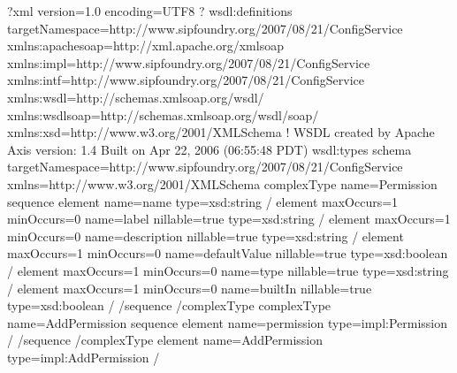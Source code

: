 \documentclass[letterpaper,10pt,english]{sphinxmanual}
\begin{document}
\begin{sphinxVerbatim}[commandchars=\\\{\}]
\PYGZlt{}?xml version=\PYGZdq{}1.0\PYGZdq{} encoding=\PYGZdq{}UTF\PYGZhy{}8\PYGZdq{} ?\PYGZgt{}
\PYGZlt{}wsdl:definitions targetNamespace=\PYGZdq{}http://www.sipfoundry.org/2007/08/21/ConfigService\PYGZdq{} xmlns:apachesoap=\PYGZdq{}http://xml.apache.org/xml\PYGZhy{}soap\PYGZdq{} xmlns:impl=\PYGZdq{}http://www.sipfoundry.org/2007/08/21/ConfigService\PYGZdq{} xmlns:intf=\PYGZdq{}http://www.sipfoundry.org/2007/08/21/ConfigService\PYGZdq{} xmlns:wsdl=\PYGZdq{}http://schemas.xmlsoap.org/wsdl/\PYGZdq{} xmlns:wsdlsoap=\PYGZdq{}http://schemas.xmlsoap.org/wsdl/soap/\PYGZdq{} xmlns:xsd=\PYGZdq{}http://www.w3.org/2001/XMLSchema\PYGZdq{}\PYGZgt{}
\PYGZhy{} \PYGZlt{}!\PYGZhy{}\PYGZhy{}
WSDL created by Apache Axis version: 1.4
Built on Apr 22, 2006 (06:55:48 PDT)
\PYGZhy{}\PYGZhy{}\PYGZgt{}
\PYGZlt{}wsdl:types\PYGZgt{}
\PYGZlt{}schema targetNamespace=\PYGZdq{}http://www.sipfoundry.org/2007/08/21/ConfigService\PYGZdq{} xmlns=\PYGZdq{}http://www.w3.org/2001/XMLSchema\PYGZdq{}\PYGZgt{}
\PYGZlt{}complexType name=\PYGZdq{}Permission\PYGZdq{}\PYGZgt{}
\PYGZlt{}sequence\PYGZgt{}
\PYGZlt{}element name=\PYGZdq{}name\PYGZdq{} type=\PYGZdq{}xsd:string\PYGZdq{} /\PYGZgt{}
\PYGZlt{}element maxOccurs=\PYGZdq{}1\PYGZdq{} minOccurs=\PYGZdq{}0\PYGZdq{} name=\PYGZdq{}label\PYGZdq{} nillable=\PYGZdq{}true\PYGZdq{} type=\PYGZdq{}xsd:string\PYGZdq{} /\PYGZgt{}
\PYGZlt{}element maxOccurs=\PYGZdq{}1\PYGZdq{} minOccurs=\PYGZdq{}0\PYGZdq{} name=\PYGZdq{}description\PYGZdq{} nillable=\PYGZdq{}true\PYGZdq{} type=\PYGZdq{}xsd:string\PYGZdq{} /\PYGZgt{}
\PYGZlt{}element maxOccurs=\PYGZdq{}1\PYGZdq{} minOccurs=\PYGZdq{}0\PYGZdq{} name=\PYGZdq{}defaultValue\PYGZdq{} nillable=\PYGZdq{}true\PYGZdq{} type=\PYGZdq{}xsd:boolean\PYGZdq{} /\PYGZgt{}
\PYGZlt{}element maxOccurs=\PYGZdq{}1\PYGZdq{} minOccurs=\PYGZdq{}0\PYGZdq{} name=\PYGZdq{}type\PYGZdq{} nillable=\PYGZdq{}true\PYGZdq{} type=\PYGZdq{}xsd:string\PYGZdq{} /\PYGZgt{}
\PYGZlt{}element maxOccurs=\PYGZdq{}1\PYGZdq{} minOccurs=\PYGZdq{}0\PYGZdq{} name=\PYGZdq{}builtIn\PYGZdq{} nillable=\PYGZdq{}true\PYGZdq{} type=\PYGZdq{}xsd:boolean\PYGZdq{} /\PYGZgt{}
\PYGZlt{}/sequence\PYGZgt{}
\PYGZlt{}/complexType\PYGZgt{}
\PYGZlt{}complexType name=\PYGZdq{}AddPermission\PYGZdq{}\PYGZgt{}
\PYGZlt{}sequence\PYGZgt{}
\PYGZlt{}element name=\PYGZdq{}permission\PYGZdq{} type=\PYGZdq{}impl:Permission\PYGZdq{} /\PYGZgt{}
\PYGZlt{}/sequence\PYGZgt{}
\PYGZlt{}/complexType\PYGZgt{}
\PYGZlt{}element name=\PYGZdq{}AddPermission\PYGZdq{} type=\PYGZdq{}impl:AddPermission\PYGZdq{} /\PYGZgt{}

\end{sphinxVerbatim}
\end{document}
